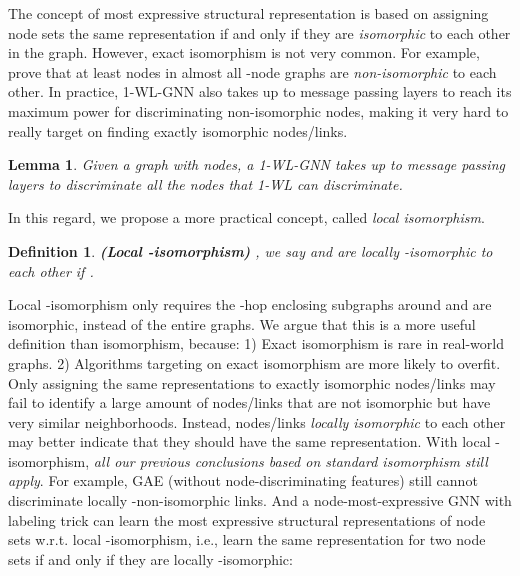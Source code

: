 \documentclass{article}
\newtheorem{definition}{Definition}
\newtheorem{lemma}{Lemma}
\begin{document}
The concept of most expressive structural representation is based on assigning node sets the same representation if and only if they are \textit{isomorphic} to each other in the graph. However, exact isomorphism is not very common. For example, \citet{babai1979canonical} prove that at least  nodes in almost all -node graphs are \textit{non-isomorphic} to each other. In practice, 1-WL-GNN also takes up to  message passing layers to reach its maximum power for discriminating non-isomorphic nodes, making it very hard to really target on finding exactly isomorphic nodes/links.

\begin{lemma}\label{wlconverge}
Given a graph with  nodes, a 1-WL-GNN takes up to  message passing layers to discriminate all the nodes that 1-WL can discriminate. \end{lemma}





















In this regard, we propose a more practical concept, called \textit{local isomorphism}. 

\begin{definition}\label{localhiso}
\textbf{(Local -isomorphism)} , we say  and  are locally -isomorphic to each other if .
\end{definition}

Local -isomorphism only requires the -hop enclosing subgraphs around  and  are isomorphic, instead of the entire graphs. We argue that this is a more useful definition than isomorphism, because: 1) Exact isomorphism is rare in real-world graphs. 2) Algorithms targeting on exact isomorphism are more likely to overfit. Only assigning the same representations to exactly isomorphic nodes/links may fail to identify a large amount of nodes/links that are not isomorphic but have very similar neighborhoods. Instead, nodes/links \textit{locally isomorphic} to each other may better indicate that they should have the same representation. 
With local -isomorphism, \textit{all our previous conclusions based on standard isomorphism still apply}. For example, GAE (without node-discriminating features) still cannot discriminate locally -non-isomorphic links. And a node-most-expressive GNN with labeling trick can learn the most expressive structural representations of node sets w.r.t. local -isomorphism, i.e., learn the same representation for two node sets if and only if they are locally -isomorphic:
\end{document}
